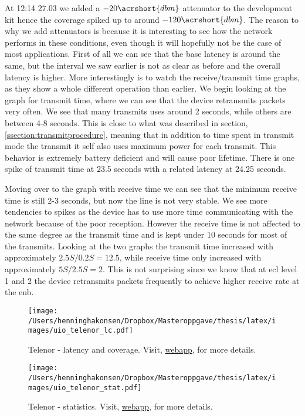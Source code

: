 \documentclass[USenglish]{ifimaster}  %
\begin{document}
At 12:14 27.03 we added a ${-20 \acrshort{dbm}}$ attenuator to the development kit hence the coverage spiked up to around ${-120 \acrshort{dbm}}$. The reason to why we add attenuators is because it is interesting to see how the network performs in these conditions, even though it will hopefully not be the case of most applications. First of all we can see that the base latency is around the same, but the interval we saw earlier is not as clear as before and the overall latency is higher. More interestingly is to watch the receive/transmit time graphs, as they show a whole different operation than earlier. We begin looking at the graph for transmit time, where we can see that the device retransmits packets very often. We see that many transmits uses around 2 seconds, while others are between 4-8 seconds. This is close to what was described in section, \vref{ssection:transmitprocedure}, meaning that in addition to time spent in transmit mode the transmit it self also uses maximum power for each transmit. This behavior is extremely battery deficient and will cause poor lifetime. There is one spike of transmit time at 23.5 seconds with a related latency at 24.25 seconds.

Moving over to the graph with receive time we can see that the minimum receive time is still 2-3 seconds, but now the line is not very stable. We see more tendencies to spikes as the device has to use more time communicating with the network because of the poor reception. However the receive time is not affected to the same degree as the transmit time and is kept under 10 seconds for most of the transmits. Looking at the two graphs the transmit time increased with approximately ${2.5S / 0.2S = 12.5}$, while receive time only increased with approximately ${5S / 2.5S = 2}$. This is not surprising since we know that at \acrshort{ecl} level 1 and 2 the device retransmits packets frequently to achieve higher receive rate at the \acrshort{enb}.

\begin{figure}[H]
  \centering
  \texttt{[image: /Users/henninghakonsen/Dropbox/Masteroppgave/thesis/latex/images/uio\_telenor\_lc.pdf]}
  \caption{Telenor - latency and coverage. Visit, \href{http://158.39.77.97:9000/\#/nodes/id2}{webapp}, for more details.}
  \label{figure:uio_telenor_lc}
\end{figure}

\begin{figure}[H]
  \centering
  \texttt{[image: /Users/henninghakonsen/Dropbox/Masteroppgave/thesis/latex/images/uio\_telenor\_stat.pdf]}
  \caption{Telenor - statistics. Visit, \href{http://158.39.77.97:9000/\#/nodes/id2}{webapp}, for more details.}
  \label{figure:uio_telenor_stat}
\end{figure}
\end{document}
